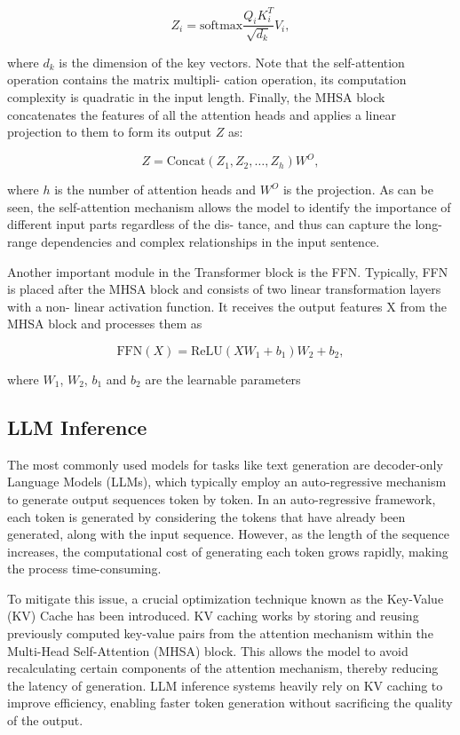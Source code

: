 \begin{equation*}
    Z_i = \text{softmax}\frac{Q_iK_i^T}{\sqrt{d_k}}V_i,
\end{equation*}

where $d_k$ is the dimension of the key vectors. Note that
the self-attention operation contains the matrix multipli-
cation operation, its computation complexity is quadratic
in the input length. Finally, the MHSA block concatenates
the features of all the attention heads and applies a linear
projection to them to form its output $Z$ as:

\begin{equation*}
    Z = \text{Concat}(Z_1,Z_2,\dots,Z_h)W^O,
\end{equation*}

where $h$ is the number of attention heads and $W^O$ is the projection. As can be seen, the
self-attention mechanism allows the model to identify the
importance of different input parts regardless of the dis-
tance, and thus can capture the long-range dependencies
and complex relationships in the input sentence.

Another important module in the Transformer block is
the FFN. Typically, FFN is placed after the MHSA block
and consists of two linear transformation layers with a non-
linear activation function. It receives the output features X
from the MHSA block and processes them as

\begin{equation*}
    \text{FFN}(X) = \text{ReLU}(XW_1+b_1)W_2+b_2,
\end{equation*}

where $W_1$, $W_2$, $b_1$ and $b_2$ are the learnable parameters

\subsection{LLM Inference}
The most commonly used models for tasks like text generation are decoder-only Language Models (LLMs), which typically employ an auto-regressive mechanism to generate output sequences token by token. In an auto-regressive framework, each token is generated by considering the tokens that have already been generated, along with the input sequence. However, as the length of the sequence increases, the computational cost of generating each token grows rapidly, making the process time-consuming.

To mitigate this issue, a crucial optimization technique known as the Key-Value (KV) Cache has been introduced. KV caching works by storing and reusing previously computed key-value pairs from the attention mechanism within the Multi-Head Self-Attention (MHSA) block. This allows the model to avoid recalculating certain components of the attention mechanism, thereby reducing the latency of generation. LLM inference systems heavily rely on KV caching to improve efficiency, enabling faster token generation without sacrificing the quality of the output.

